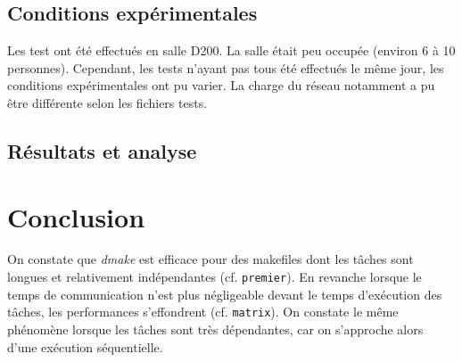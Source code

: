 \documentclass[a4paper,12pt,twoside]{article}
\begin{document}
\subsection{Conditions expérimentales}

Les test ont été effectués en salle D200. La salle était peu occupée
(environ 6 à 10 personnes). Cependant, les tests n'ayant pas tous été
effectués le même jour, les conditions expérimentales ont pu
varier. La charge du réseau notamment a pu être différente selon les
fichiers tests.

\subsection{Résultats et analyse}

\section*{Conclusion}
On constate que \emph{dmake} est efficace pour des makefiles dont les
tâches sont longues et relativement indépendantes
(cf. \texttt{premier}). En revanche lorsque le temps de communication
n'est plus négligeable devant le temps d'exécution des tâches, les
performances s'effondrent (cf. \texttt{matrix}). On constate le même phénomène lorsque les
tâches sont très dépendantes, car on s'approche alors d'une exécution séquentielle.
\end{document}
